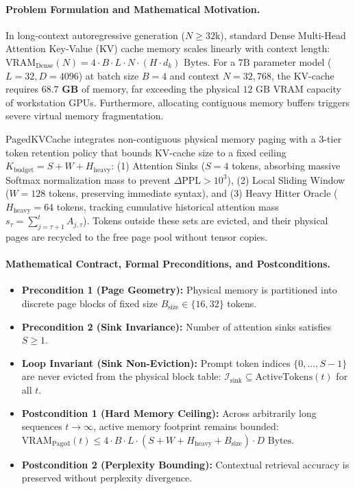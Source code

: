\paragraph{Problem Formulation and Mathematical Motivation.}
In long-context autoregressive generation ($N \ge 32\text{k}$), standard Dense Multi-Head Attention Key-Value (KV) cache memory scales linearly with context length: $\text{VRAM}_{\text{Dense}}(N) = 4 \cdot B \cdot L \cdot N \cdot (H \cdot d_k)\text{ Bytes}$. For a $7\text{B}$ parameter model ($L=32, D=4096$) at batch size $B=4$ and context $N=32{,}768$, the KV-cache requires $\mathbf{68.7\text{ GB}}$ of memory, far exceeding the physical $12\text{ GB}$ VRAM capacity of workstation GPUs. Furthermore, allocating contiguous memory buffers triggers severe virtual memory fragmentation.

PagedKVCache integrates non-contiguous physical memory paging with a 3-tier token retention policy that bounds KV-cache size to a fixed ceiling $K_{\text{budget}} = S + W + H_{\text{heavy}}$: (1) Attention Sinks ($S=4$ tokens, absorbing massive Softmax normalization mass to prevent $\Delta\text{PPL} > 10^3$), (2) Local Sliding Window ($W=128$ tokens, preserving immediate syntax), and (3) Heavy Hitter Oracle ($H_{\text{heavy}}=64$ tokens, tracking cumulative historical attention mass $s_\tau = \sum_{j=\tau+1}^t A_{j, \tau}$). Tokens outside these sets are evicted, and their physical pages are recycled to the free page pool without tensor copies.

\paragraph{Mathematical Contract, Formal Preconditions, and Postconditions.}
\begin{itemize}
    \item \textbf{Precondition 1 (Page Geometry):} Physical memory is partitioned into discrete page blocks of fixed size $B_{\text{size}} \in \{16, 32\}$ tokens.
    \item \textbf{Precondition 2 (Sink Invariance):} Number of attention sinks satisfies $S \ge 1$.
    \item \textbf{Loop Invariant (Sink Non-Eviction):} Prompt token indices $\{0, \dots, S-1\}$ are never evicted from the physical block table: $\mathcal{I}_{\text{sink}} \subseteq \text{ActiveTokens}(t)$ for all $t$.
    \item \textbf{Postcondition 1 (Hard Memory Ceiling):} Across arbitrarily long sequences $t \to \infty$, active memory footprint remains bounded: $\text{VRAM}_{\text{Paged}}(t) \le 4 \cdot B \cdot L \cdot (S + W + H_{\text{heavy}} + B_{\text{size}}) \cdot D\text{ Bytes}$.
    \item \textbf{Postcondition 2 (Perplexity Bounding):} Contextual retrieval accuracy is preserved without perplexity divergence.
\end{itemize}

